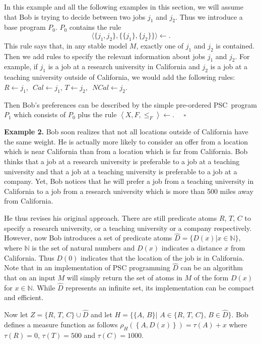 \documentclass[letterpaper]{article}\usepackage{aaai}
\begin{document}
In this example and all the following examples in this section, we will assume
that Bob is trying to decide between two jobs $j_{1}$ and $j_{2}$. Thus we
introduce a base program $P_{0}$. $P_{0}$ contains the rule
\[
\langle\{j_{1},j_{2}\},\{\{j_{1}\},\{j_{2}\}\}\rangle\leftarrow.
\]
This rule says that, in any stable model $M$, exactly one of $j_{1}$ and
$j_{2}$ is contained. Then we add rules to specify the relevant information
about jobs $j_{1}$ and $j_{2}$. For example, if $j_{1}$ is a job at a research
university in California and $j_{2}$ is a job at a teaching university outside
of California, we would add the following rules: $R\leftarrow j_{1}$,$\ \ \ Cal\leftarrow j_{1}$, $T\leftarrow j_{2}$,$\ \ \ NCal\leftarrow
j_{2}$.

Then Bob's preferences can be described by the simple pre-ordered PSC\ program
$P_{1}$ which consists of $P_{0}$ plus the rule $\left\langle X,F,\leq
_{F}\right\rangle \leftarrow$. \ \ $\square$

\textbf{Example 2.}\label{Ex2} Bob soon realizes that not all locations
outside of California have the same weight. He is actually more likely to
consider an offer from a location which is near California than from a
location which is far from California. Bob thinks that a job at a research
university is preferable to a job at a teaching university and that a job at a
teaching university is preferable to a job at a company. Yet, Bob notices that
he will prefer a job from a teaching university in California to a job from a
research university which is more than 500 miles away from California.

He thus revises his original approach. There are still predicate atoms $R$,
$T$, $C$ to specify a research university, or a teaching university or a
company respectively. However, now Bob introduces a set of predicate atoms
$\widehat{D}=\{D\left(  x\right)  |x \in\mathbb{N}\}$, where $\mathbb{N}$ is
the set of natural numbers and $D\left(  x\right)  $ indicates a distance $x$
from California. Thus $D\left(  0\right)  $ indicates that the location of the
job is in California. Note that in an implementation of PSC programming
$\widehat{D}$ can be an algorithm that on an input $M$ will simply return the
set of atoms in $M$ of the form $D(x)$ for $x \in\mathbb{N}$. While
$\widehat{D}$ represents an infinite set, its implementation can be compact
and efficient.

Now let $Z=\{R$, $T$, $C\}\cup\widehat{D}$ and let $H=\{\{A$, $B\}|$ $A\in
\{R$, $T$, $C\}$, $B\in\widehat{D}\}$. Bob defines a measure function as
follows $\rho_{H}\left(  \left\{  A,D\left(  x\right)  \right\}  \right)
=\tau\left(  A\right)  +x$ where $\tau\left(  R\right)  =0$, $\tau\left(
T\right)  =500$ and $\tau\left(  C\right)  =1000$.
\end{document}

